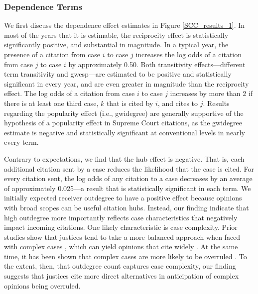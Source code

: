 \documentclass{cup-pan}
\begin{document}
\subsubsection{Dependence Terms}
We first discuss the dependence effect estimates in Figure \ref{SCC_results_1}. In most of the years that it is estimable, the reciprocity effect is statistically significantly positive, and substantial in magnitude. In a typical year, the presence of a citation from case $i$ to case $j$ increases the log odds of a citation from case $j$ to case $i$ by approximately 0.50. Both transitivity effects---different term transitivity and gwesp---are estimated to be positive and statistically significant in every year, and are even greater in magnitude than the reciprocity effect. The log odds of a citation from case $i$ to case $j$ increases by more than 2 if there is at least one third case, $k$ that is cited by $i$, and cites to $j$. Results regarding the popularity effect (i.e., gwidegree) are generally supportive of the hypothesis of a popularity effect in Supreme Court citations, as the gwidegree estimate is negative and statistically significant at conventional levels in nearly every term.

Contrary to expectations, we find that the hub effect is negative. That is, each additional citation sent by a case reduces the likelihood that the case is cited. For every citation sent, the log odds of any citation to a case decreases by an average of approximately 0.025---a result that is statistically significant in each term. We initially expected receiver outdegree to have a positive effect because opinions with broad scopes can be useful citation hubs. Instead, our finding indicate that high outdegree more importantly reflects case characteristics that negatively impact incoming citations. One likely characteristic is case complexity. Prior studies show that justices tend to take a more balanced approach when faced with complex cases \citep{collins2008amici, lindquist2007splitting}, which can yield opinions that cite widely \citep{wilkinson2005rehnquist}. At the same time, it has been shown that complex cases are more likely to be overruled \citep{spriggs2001explaining}. To the extent, then, that outdegree count captures case complexity, our finding suggests that justices cite more direct alternatives in anticipation of complex opinions being overruled.
\end{document}
